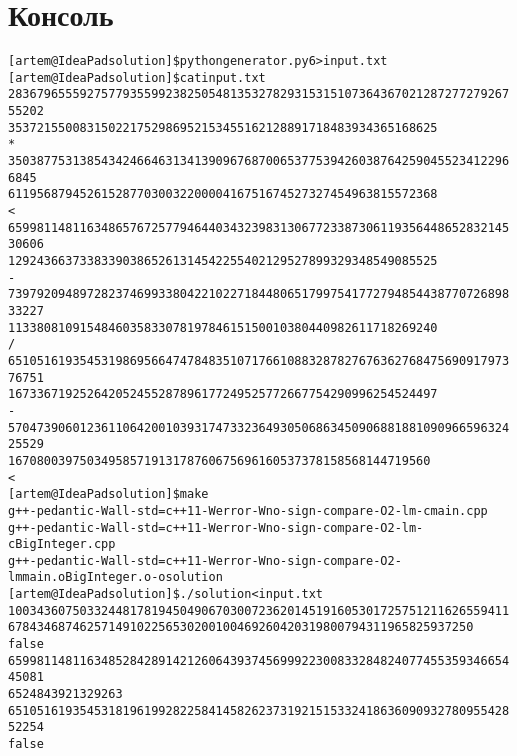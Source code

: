 \section{Консоль}
\begin{alltt}

[artem@IdeaPad solution]\$ python generator.py 6 > input.txt
[artem@IdeaPad solution]\$ cat input.txt 
283679655592757793559923825054813532782931531510736436702128727727926755202
353721550083150221752986952153455162128891718483934365168625
*
35038775313854342466463134139096768700653775394260387642590455234122966845
611956879452615287703003220000416751674527327454963815572368
<
659981148116348657672577946440343239831306772338730611935644865283214530606
129243663733833903865261314542255402129527899329348549085525
-
739792094897282374699338042210227184480651799754177279485443877072689833227
113380810915484603583307819784615150010380440982611718269240
/
651051619354531986956647478483510717661088328782767636276847569091797376751
167336719252642052455287896177249525772667754290996254524497
-
570473906012361106420010393174733236493050686345090688188109096659632425529
16708003975034958571913178760675696160537378158568144719560
<
[artem@IdeaPad solution]\$ make
g++ -pedantic -Wall -std=c++11 -Werror -Wno-sign-compare -O2 -lm -c main.cpp
g++ -pedantic -Wall -std=c++11 -Werror -Wno-sign-compare -O2 -lm -c BigInteger.cpp
g++ -pedantic -Wall -std=c++11 -Werror -Wno-sign-compare -O2 -lm main.o BigInteger.o -o solution
[artem@IdeaPad solution]\$ ./solution < input.txt 
100343607503324481781945049067030072362014519160530172575121162655941167843468746257149102256530200100469260420319800794311965825937250
false
659981148116348528428914212606439374569992230083328482407745535934665445081
6524843921329263
651051619354531819619928225841458262373192151533241863609093278095542852254
false

\end{alltt}
\pagebreak
